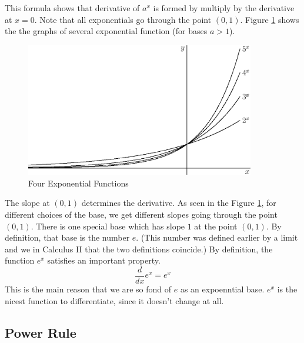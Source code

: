 \documentclass[fleqn]{report}
\begin{document}
This formula shows that derivative of $a^x$ is formed by
multiply by the derivative at $x=0$. Note that all
exponentials go through the point $(0,1)$. Figure
\ref{figure-four-exponential-functions} shows the the graphs of
several exponential function (for bases $a > 1$).

\begin{figure}[t]
\centering
\includegraphics[width=10cm]{figure49.eps}
\caption{Four Exponential Functions}
\label{figure-four-exponential-functions}
\end{figure}

The slope at $(0,1)$ determines
the derivative. As seen in the Figure
\ref{figure-four-exponential-functions}, for different choices of the
base, we get different slopes going through the point $(0,1)$. There
is one special base which has slope $1$ at the point $(0,1)$. By
definition, that base is the number $e$.  (This number was defined
earlier by a limit and we in Calculus II that the two definitions
coincide.) By definition, the function $e^x$ satisfies an important
property.
\begin{equation*}
\frac{d}{dx} e^x = e^x
\end{equation*}
This is the main reason that we are so fond of $e$ as an
expoenntial base. $e^x$ is the nicest function to
differentiate, since it doesn't change at all. 

\subsection{Power Rule}
\label{power-rule}
\end{document}
